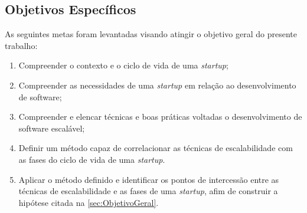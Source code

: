 \subsection{Objetivos Específicos}

As seguintes metas foram levantadas visando atingir o objetivo geral do presente
trabalho:

  \begin{enumerate}
    \item Compreender o contexto e o ciclo de vida de uma \textit{startup};
    \item Compreender as necessidades de uma \textit{startup} em relação ao desenvolvimento de software;
    \item Compreender e elencar técnicas e boas práticas voltadas o desenvolvimento de software
        escalável;
    \item Definir um método capaz de correlacionar as técnicas de escalabilidade com
        as fases do ciclo de vida de uma \textit{startup}.
    \item Aplicar o método definido e identificar os pontos de intercessão entre as técnicas de escalabilidade
        e as fases de uma \textit{startup}, afim de construir a hipótese citada na \autoref{sec:ObjetivoGeral}.
  \end{enumerate}
